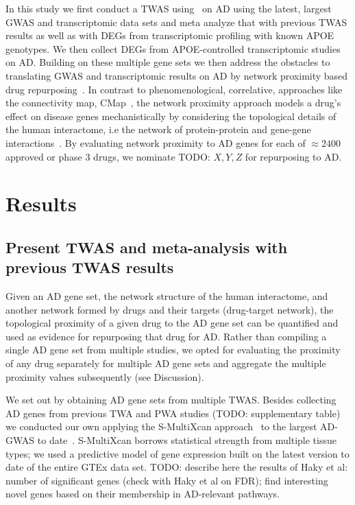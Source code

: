 \documentclass[letterpaper]{article}
\begin{document}
In this study we first conduct a TWAS using~\citep{Barbeira2018} on AD using the
latest, largest GWAS and transcriptomic data sets and meta analyze that with
previous TWAS results as well as with DEGs from transcriptomic profiling with
known APOE genotypes.  We then collect DEGs from APOE-controlled
transcriptomic studies on AD.  Building on these multiple gene sets we then
address the obstacles to translating GWAS and transcriptomic results on AD by
network proximity based drug repurposing~\citep{Cheng2018}.  In contrast to
phenomenological, correlative, approaches like the connectivity map,
CMap~\citep{Lamb2006}, the network proximity approach models a drug's effect
on disease genes mechanistically by considering the topological details of the
human interactome, i.e the network of protein-protein and gene-gene
interactions~\citep{Guney2016,Barabasi2011}.  By evaluating network proximity
to AD genes for each of $\approx 2400$ approved or phase 3 drugs, we nominate
TODO: $X, Y, Z$ for repurposing to AD.

\section{Results}

\subsection{Present TWAS and meta-analysis with previous TWAS results}

Given an AD gene set, the network structure of the human interactome, and
another network formed by drugs and their targets (drug-target network), the
topological proximity of a given drug to the AD gene set can be
quantified\citep{Guney2016} and used as evidence for repurposing that drug for
AD.  Rather than compiling a single AD gene set from multiple studies, we
opted for evaluating the proximity of any drug separately for multiple AD gene
sets and aggregate the multiple proximity values subsequently (see
Discussion).

We set out by obtaining AD gene sets from multiple TWAS.  Besides collecting
AD genes from previous TWA and PWA studies (TODO: supplementary table) we
conducted our own applying the S-MultiXcan approach~\citep{Barbeira2018} to
the largest AD-GWAS to date~\citep{Schwartzentruber2021}.  S-MultiXcan borrows
statistical strength from multiple tissue types; we used a predictive model of
gene expression built on the latest version to date of the entire GTEx data
set.  TODO: describe here the results of Haky et al: number of significant
genes (check with Haky et al on FDR); find interesting novel genes based on
their membership in AD-relevant pathways.
\end{document}
